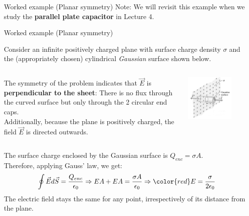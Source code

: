 {\begin{frame}{Worked example (Planar symmetry)}
  Note: We will revisit this example when we study the {\bf parallel plate capacitor}
  in Lecture 4.\\

\end{frame}

%
%
%

\begin{frame}{Worked example (Planar symmetry)}

  Consider an infinite positively charged plane with surface charge density
  $\sigma$ and the (appropriately chosen)
  cylindrical {\em Gaussian} surface shown below.\\

  \begin{columns}
   \begin{column}{0.60\textwidth}
    The symmetry of the problem indicates that $\vec{E}$ is
    {\bf perpendicular to the sheet}: There is no
    flux through the curved surface but only through the 2 circular end caps.\\
    \vspace{0.2cm}
    Additionally, because the plane is positively charged, the field $\vec{E}$
    is directed outwards.\\
   \end{column}
   \begin{column}{0.40\textwidth}
    \begin{center}
      \includegraphics[width=0.70\textwidth]{./images/problems/lect02_charged_plane_3d.png}\\
    \end{center}
   \end{column}
  \end{columns}
  The surface charge enclosed by the Gaussian surface is $Q_{enc} = \sigma A$.\\
  \vspace{0.2cm}
  Therefore, applying Gauss' law, we get:
  \begin{equation*}
    \oint \vec{E} d\vec{S} = \frac{Q_{enc}}{\epsilon_0} \Rightarrow
    EA + EA = \frac{\sigma A}{\epsilon_0} \Rightarrow
    {\color{red}
      E = \frac{\sigma}{2\epsilon_0}
    }
  \end{equation*}
  The electric field stays the same for any point, irrespectively of its distance from the plane.


\end{frame}}

